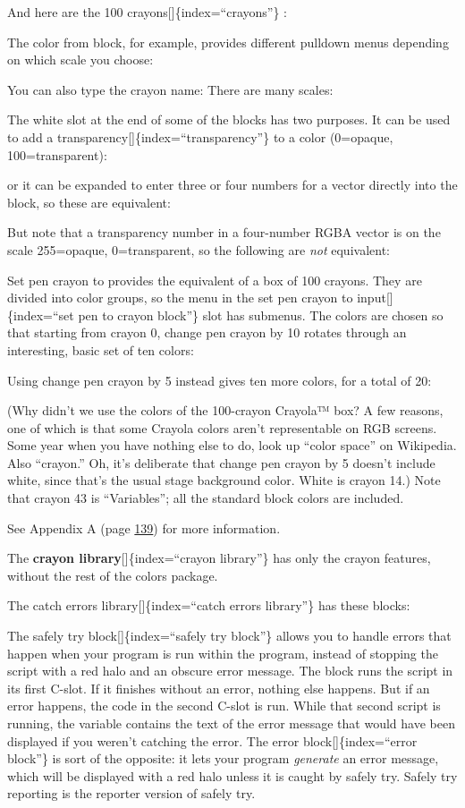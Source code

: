 \documentclass[
  letterpaper,
]{book}
\begin{document}
And here are the 100 crayons{[}{]}\{index=``crayons''\} :

The color from block, for example, provides different pulldown menus
depending on which scale you choose:

You can also type the crayon name: There are many scales:

The white slot at the end of some of the blocks has two purposes. It can
be used to add a transparency{[}{]}\{index=``transparency''\} to a color
(0=opaque, 100=transparent):

or it can be expanded to enter three or four numbers for a vector
directly into the block, so these are equivalent:

But note that a transparency number in a four-number RGBA vector is on
the scale 255=opaque, 0=transparent, so the following are \emph{not}
equivalent:

Set pen crayon to provides the equivalent of a box of 100 crayons. They
are divided into color groups, so the menu in the set pen crayon to
input{[}{]}\{index=``set pen to crayon block''\} slot has submenus. The
colors are chosen so that starting from crayon 0, change pen crayon by
10 rotates through an interesting, basic set of ten colors:

Using change pen crayon by 5 instead gives ten more colors, for a total
of 20:

(Why didn't we use the colors of the 100-crayon Crayola™ box? A few
reasons, one of which is that some Crayola colors aren't representable
on RGB screens. Some year when you have nothing else to do, look up
``color space'' on Wikipedia. Also ``crayon.'' Oh, it's deliberate that
change pen crayon by 5 doesn't include white, since that's the usual
stage background color. White is crayon 14.) Note that crayon 43 is
``Variables''; all the standard block colors are included.

See Appendix A (page \hyperref[crayons-and-color-numbers]{139}) for more
information.

The \textbf{crayon library}{[}{]}\{index=``crayon library''\} has only
the crayon features, without the rest of the colors package.

The catch errors library{[}{]}\{index=``catch errors library''\} has
these blocks:

The safely try block{[}{]}\{index=``safely try block''\} allows you to
handle errors that happen when your program is run within the program,
instead of stopping the script with a red halo and an obscure error
message. The block runs the script in its first C-slot. If it finishes
without an error, nothing else happens. But if an error happens, the
code in the second C-slot is run. While that second script is running,
the variable contains the text of the error message that would have been
displayed if you weren't catching the error. The error
block{[}{]}\{index=``error block''\} is sort of the opposite: it lets
your program \emph{generate} an error message, which will be displayed
with a red halo unless it is caught by safely try. Safely try reporting
is the reporter version of safely try.
\end{document}
